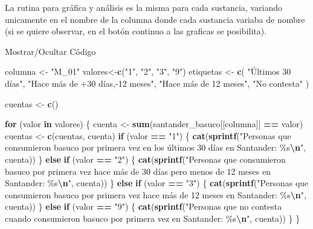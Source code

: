 \documentclass[
]{article}
\newenvironment{Shaded}{\begin{snugshade}}{\end{snugshade}}
\newcommand{\ControlFlowTok}[1]{\textcolor[rgb]{0.13,0.29,0.53}{\textbf{#1}}}
\newcommand{\FunctionTok}[1]{\textcolor[rgb]{0.13,0.29,0.53}{\textbf{#1}}}
\newcommand{\NormalTok}[1]{#1}
\newcommand{\OtherTok}[1]{\textcolor[rgb]{0.56,0.35,0.01}{#1}}
\newcommand{\SpecialCharTok}[1]{\textcolor[rgb]{0.81,0.36,0.00}{\textbf{#1}}}
\newcommand{\StringTok}[1]{\textcolor[rgb]{0.31,0.60,0.02}{#1}}
\begin{document}
La rutina para gráfica y análisis es la misma para cada sustancia,
variando unicamente en el nombre de la columna donde cada sustancia
variaba de nombre (si se quiere observar, en el botón continuo a las
graficas se posibilita).

Mostrar/Ocultar Código

\label{section4}
\begin{Shaded}
\begin{Highlighting}[]
\NormalTok{columna }\OtherTok{\textless{}{-}} \StringTok{"M\_01"}
\NormalTok{valores}\OtherTok{\textless{}{-}}\FunctionTok{c}\NormalTok{(}\StringTok{"1"}\NormalTok{, }\StringTok{"2"}\NormalTok{, }\StringTok{"3"}\NormalTok{, }\StringTok{"9"}\NormalTok{)}
\NormalTok{etiquetas }\OtherTok{\textless{}{-}} \FunctionTok{c}\NormalTok{(}
  \StringTok{"Últimos 30 días"}\NormalTok{,}
  \StringTok{"Hace más de +30 días,{-}12 meses"}\NormalTok{,}
  \StringTok{"Hace más de 12 meses"}\NormalTok{,}
  \StringTok{"No contesta"}
\NormalTok{)}

\NormalTok{cuentas }\OtherTok{\textless{}{-}} \FunctionTok{c}\NormalTok{()}

\ControlFlowTok{for}\NormalTok{ (valor }\ControlFlowTok{in}\NormalTok{ valores) \{}
\NormalTok{  cuenta }\OtherTok{\textless{}{-}} \FunctionTok{sum}\NormalTok{(santander\_basuco[[columna]] }\SpecialCharTok{==}\NormalTok{ valor)}
\NormalTok{  cuentas }\OtherTok{\textless{}{-}} \FunctionTok{c}\NormalTok{(cuentas, cuenta) }
  \ControlFlowTok{if}\NormalTok{ (valor }\SpecialCharTok{==} \StringTok{"1"}\NormalTok{) \{}
    \FunctionTok{cat}\NormalTok{(}\FunctionTok{sprintf}\NormalTok{(}\StringTok{"Personas que consumieron basuco por primera vez en los últimos 30 días en Santander: \%s}\SpecialCharTok{\textbackslash{}n}\StringTok{"}\NormalTok{, cuenta))}
\NormalTok{  \} }\ControlFlowTok{else} \ControlFlowTok{if}\NormalTok{ (valor }\SpecialCharTok{==} \StringTok{"2"}\NormalTok{) \{}
    \FunctionTok{cat}\NormalTok{(}\FunctionTok{sprintf}\NormalTok{(}\StringTok{"Personas que consumieron basuco por primera vez hace más de 30 días pero menos de 12 meses en Santander: \%s}\SpecialCharTok{\textbackslash{}n}\StringTok{"}\NormalTok{, cuenta))}
\NormalTok{  \} }\ControlFlowTok{else} \ControlFlowTok{if}\NormalTok{ (valor }\SpecialCharTok{==} \StringTok{"3"}\NormalTok{) \{}
    \FunctionTok{cat}\NormalTok{(}\FunctionTok{sprintf}\NormalTok{(}\StringTok{"Personas que consumieron basuco por primera vez hace más de 12 meses en Santander: \%s}\SpecialCharTok{\textbackslash{}n}\StringTok{"}\NormalTok{, cuenta))}
\NormalTok{  \} }\ControlFlowTok{else} \ControlFlowTok{if}\NormalTok{ (valor }\SpecialCharTok{==} \StringTok{"9"}\NormalTok{) \{}
    \FunctionTok{cat}\NormalTok{(}\FunctionTok{sprintf}\NormalTok{(}\StringTok{"Personas que no contesta cuando consumieron basuco por primera vez en Santander: \%s}\SpecialCharTok{\textbackslash{}n}\StringTok{"}\NormalTok{, cuenta))}
\NormalTok{  \}}
\NormalTok{\}}


\end{Highlighting}
\end{Shaded}
\end{document}
